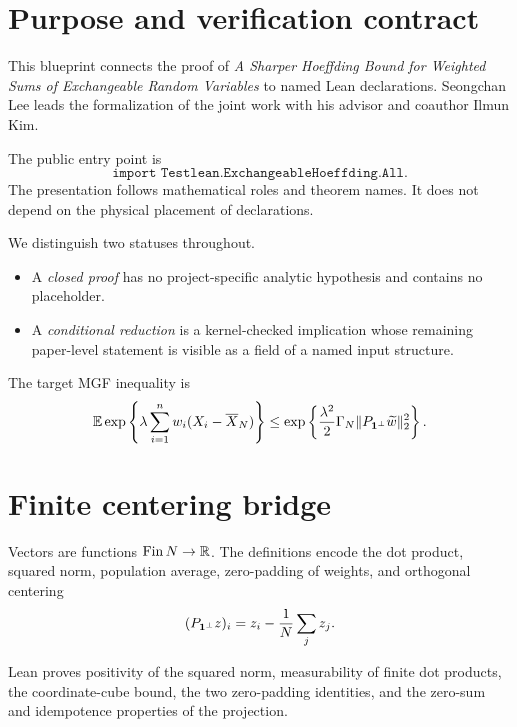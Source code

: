 \section{Purpose and verification contract}

This blueprint connects the proof of
\emph{A Sharper Hoeffding Bound for Weighted Sums of Exchangeable Random
Variables} to named Lean declarations.  Seongchan Lee leads the formalization
of the joint work with his advisor and coauthor Ilmun Kim.

The public entry point is
\[
  \texttt{import Testlean.ExchangeableHoeffding.All}.
\]
The presentation follows mathematical roles and theorem names.  It does not
depend on the physical placement of declarations.

We distinguish two statuses throughout.
\begin{itemize}
  \item A \emph{closed proof} has no project-specific analytic hypothesis and
  contains no placeholder.
  \item A \emph{conditional reduction} is a kernel-checked implication whose
  remaining paper-level statement is visible as a field of a named input
  structure.
\end{itemize}

The target MGF inequality is
\[
  \mathbb{E} \exp\left\{\lambda\sum_{i=1}^{n}
    w_i(X_i-\overline X_N)\right\}
  \le
  \exp\left\{\frac{\lambda^2}{2}\Gamma_N
    \|P_{\mathbf{1}^\perp}\widetilde w\|_2^2\right\}.
\]

\section{Finite centering bridge}

\begin{definition}
Vectors are functions \(\operatorname{Fin}N\to\mathbb{R}\).  The definitions encode
the dot product, squared norm, population average, zero-padding of weights, and
orthogonal centering
\[
  (P_{\mathbf{1}^\perp}z)_i=z_i-\frac1N\sum_jz_j.
\]
\end{definition}

\begin{lemma}
\label{lem:finite-bridge}
Lean proves positivity of the squared norm, measurability of finite dot
products, the coordinate-cube bound, the two zero-padding identities, and the
zero-sum and idempotence properties of the projection.
\end{lemma}

